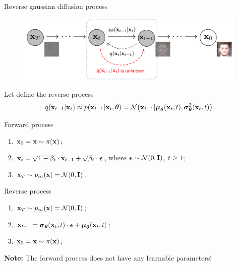 \begin{frame}{Reverse gaussian diffusion process}
	\vspace{-0.3cm} 
	\begin{figure}
		\includegraphics[width=0.8\linewidth]{figs/DDPM}
	\end{figure}
	\vspace{-0.3cm} 
	Let define the reverse process
	\vspace{-0.2cm}
	\[
		q(\mathbf{x}_{t-1}|\mathbf{x}_{t}) \approx p(\mathbf{x}_{t - 1} | \mathbf{x}_t, \boldsymbol{\theta}) = \mathcal{N} \bigl(\mathbf{x}_{t - 1} | \boldsymbol{\mu}_{\boldsymbol{\theta}}(\mathbf{x}_t, t), \boldsymbol{\sigma}_{\boldsymbol{\theta}}^2(\mathbf{x}_t, t)\bigr)
	\]
	\vspace{-0.7cm}
	\begin{minipage}{0.5\linewidth}
		\begin{block}{Forward process}
			\begin{enumerate}
				\item $\mathbf{x}_0 = \mathbf{x} \sim \pi(\mathbf{x})$;
				\item $\mathbf{x}_t = \sqrt{1 - \beta_t} \cdot \mathbf{x}_{t - 1} + \sqrt{\beta_t} \cdot \boldsymbol{\epsilon}$, where $\boldsymbol{\epsilon} \sim \mathcal{N}(0, \mathbf{I})$, $t \geq 1$;
				\item $\mathbf{x}_T \sim p_{\infty}(\mathbf{x}) = \mathcal{N}(0, \mathbf{I})$.
			\end{enumerate}
		\end{block}
	\end{minipage}%
	\begin{minipage}{0.5\linewidth}
		\begin{block}{Reverse process}
			\begin{enumerate}
				\item $\mathbf{x}_T \sim p_{\infty}(\mathbf{x}) = \mathcal{N}(0, \mathbf{I})$;
				\item $\mathbf{x}_{t - 1} = \boldsymbol{\sigma}_{\boldsymbol{\theta}}(\mathbf{x}_t, t) \cdot \boldsymbol{\epsilon} + \boldsymbol{\mu}_{\boldsymbol{\theta}}(\mathbf{x}_t, t)$;
				\item $\mathbf{x}_0 = \mathbf{x} \sim \pi(\mathbf{x})$;
			\end{enumerate}
		\end{block}
	\end{minipage}
	\textbf{Note:} The forward process does not have any learnable parameters!
\end{frame}
